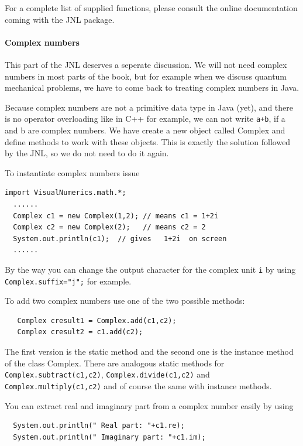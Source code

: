 For a complete list of supplied functions, please consult the online 
documentation coming with the JNL package.

\paragraph{Complex numbers}
This part of the JNL deserves a seperate discussion. We will not need
complex numbers in most parts of the book, but for example when
we discuss quantum mechanical problems, we have to come back to
treating complex numbers in Java.

Because complex numbers are not a primitive data type in Java (yet),
and there is no operator overloading like in C++ for example, we
can not write \verb|a+b|, if a and b are complex numbers. We have
create a new object called Complex and define methods to work with
these objects. This is exactly the solution followed by the JNL,
so we do not need to do it again.

To instantiate complex numbers issue 
\begin{verbatim}
import VisualNumerics.math.*;
  ......
  Complex c1 = new Complex(1,2); // means c1 = 1+2i  
  Complex c2 = new Complex(2);   // means c2 = 2  
  System.out.println(c1);  // gives   1+2i  on screen
  ......
\end{verbatim}
By the way you can change the output character for the complex
unit \verb|i| by using \verb|Complex.suffix="j";| for example.

To add two complex numbers use one of the two possible methods:
\begin{verbatim}
   Complex cresult1 = Complex.add(c1,c2);
   Complex cresult2 = c1.add(c2);
\end{verbatim}
The first version is the static method and the second one is
the instance method of the class Complex. There are analogous
static methods for \verb|Complex.subtract(c1,c2)|, \verb|Complex.divide(c1,c2)|
and \verb|Complex.multiply(c1,c2)| and of course the same with
instance methods.

You can extract real and imaginary part from a complex number
easily by using
\begin{verbatim}
  System.out.println(" Real part: "+c1.re);
  System.out.println(" Imaginary part: "+c1.im);
\end{verbatim}

